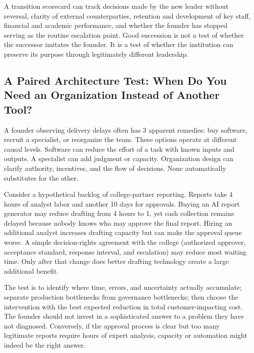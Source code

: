 A transition scorecard can track decisions made by the new leader without reversal, clarity of external counterparties, retention and development of key staff, financial and academic performance, and whether the founder has stopped serving as the routine escalation point. Good succession is not a test of whether the successor imitates the founder. It is a test of whether the institution can preserve its purpose through legitimately different leadership.

\subsection*{A Paired Architecture Test: When Do You Need an Organization Instead of Another Tool?}

A founder observing delivery delays often has 3 apparent remedies: buy software, recruit a specialist, or reorganize the team. These options operate at different causal levels. Software can reduce the effort of a task with known inputs and outputs. A specialist can add judgment or capacity. Organization design can clarify authority, incentives, and the flow of decisions. None automatically substitutes for the other.

Consider a hypothetical backlog of college-partner reporting. Reports take 4 hours of analyst labor and another 10 days for approvals. Buying an AI report generator may reduce drafting from 4 hours to 1, yet cash collection remains delayed because nobody knows who may approve the final report. Hiring an additional analyst increases drafting capacity but can make the approval queue worse. A simple decision-rights agreement with the college (authorized approver, acceptance standard, response interval, and escalation) may reduce most waiting time. Only after that change does better drafting technology create a large additional benefit.

The test is to identify where time, errors, and uncertainty actually accumulate; separate production bottlenecks from governance bottlenecks; then choose the intervention with the best expected reduction in total customer-impacting cost. The founder should not invest in a sophisticated answer to a problem they have not diagnosed. Conversely, if the approval process is clear but too many legitimate reports require hours of expert analysis, capacity or automation might indeed be the right answer.

